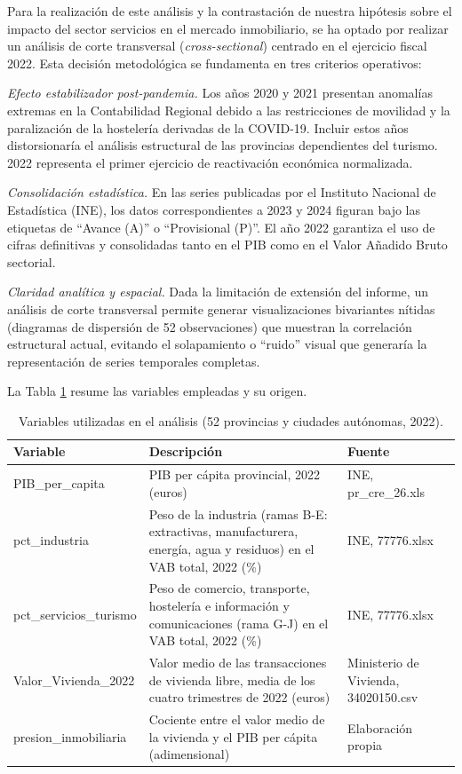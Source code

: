 \documentclass[econometrics,article,submit,moreauthors,pdftex]{Definitions/mdpi}
\begin{document}
Para la realización de este análisis y la contrastación de nuestra
hipótesis sobre el impacto del sector servicios en el mercado
inmobiliario, se ha optado por realizar un análisis de corte transversal
(\emph{cross-sectional}) centrado en el ejercicio fiscal 2022. Esta
decisión metodológica se fundamenta en tres criterios operativos:

\emph{Efecto estabilizador post-pandemia.} Los años 2020 y 2021
presentan anomalías extremas en la Contabilidad Regional debido a las
restricciones de movilidad y la paralización de la hostelería derivadas
de la COVID-19. Incluir estos años distorsionaría el análisis
estructural de las provincias dependientes del turismo. 2022 representa
el primer ejercicio de reactivación económica normalizada.

\emph{Consolidación estadística.} En las series publicadas por el
Instituto Nacional de Estadística (INE), los datos correspondientes a
2023 y 2024 figuran bajo las etiquetas de ``Avance (A)'' o ``Provisional
(P)''. El año 2022 garantiza el uso de cifras definitivas y consolidadas
tanto en el PIB como en el Valor Añadido Bruto sectorial.

\emph{Claridad analítica y espacial.} Dada la limitación de extensión
del informe, un análisis de corte transversal permite generar
visualizaciones bivariantes nítidas (diagramas de dispersión de 52
observaciones) que muestran la correlación estructural actual, evitando
el solapamiento o ``ruido'' visual que generaría la representación de
series temporales completas.

La Tabla \ref{tab:tabvars} resume las variables empleadas y su origen.

\begin{table}[H]

\caption{\label{tab:tabvars}Variables utilizadas en el análisis (52 provincias y ciudades autónomas, 2022).}
\centering
\begin{tabular}[t]{l>{\raggedright\arraybackslash}p{5cm}>{\raggedright\arraybackslash}p{3.3cm}}
\toprule
Variable & Descripción & Fuente\\
\midrule
PIB\_per\_capita & PIB per cápita provincial, 2022 (euros) & INE, pr\_cre\_26.xls\\
pct\_industria & Peso de la industria (ramas B-E: extractivas, manufacturera, energía, agua y residuos) en el VAB total, 2022 (\%) & INE, 77776.xlsx\\
pct\_servicios\_turismo & Peso de comercio, transporte, hostelería e información y comunicaciones (rama G-J) en el VAB total, 2022 (\%) & INE, 77776.xlsx\\
Valor\_Vivienda\_2022 & Valor medio de las transacciones de vivienda libre, media de los cuatro trimestres de 2022 (euros) & Ministerio de Vivienda, 34020150.csv\\
presion\_inmobiliaria & Cociente entre el valor medio de la vivienda y el PIB per cápita (adimensional) & Elaboración propia\\
\bottomrule
\end{tabular}
\end{table}
\end{document}
